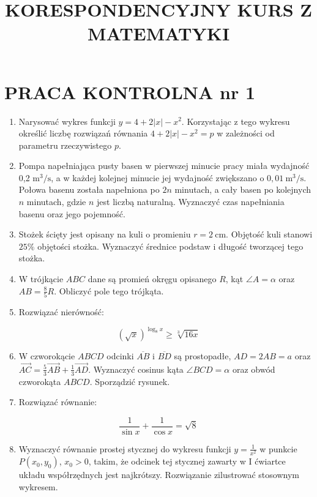 \documentclass[10pt]{article}
\title{KORESPONDENCYJNY KURS Z MATEMATYKI }
\author{}
\date{}
\begin{document}
\maketitle
\section*{PRACA KONTROLNA nr 1}
\begin{enumerate}
  \item Narysować wykres funkcji $y=4+2|x|-x^{2}$. Korzystając z tego wykresu określić liczbę rozwiązań równania $4+2|x|-x^{2}=p$ w zależności od parametru rzeczywistego $p$.
  \item Pompa napełniająca pusty basen w pierwszej minucie pracy miała wydajność 0,2 $\mathrm{m}^{3} / \mathrm{s}$, a w każdej kolejnej minucie jej wydajność zwiększano o $0,01 \mathrm{~m}^{3} / \mathrm{s}$. Połowa basenu została napełniona po $2 n$ minutach, a cały basen po kolejnych $n$ minutach, gdzie $n$ jest liczbą naturalną. Wyznaczyć czas napełniania basenu oraz jego pojemność.
  \item Stożek ścięty jest opisany na kuli o promieniu $r=2 \mathrm{~cm}$. Objętość kuli stanowi $25 \%$ objętości stożka. Wyznaczyć średnice podstaw i długość tworzącej tego stożka.
  \item W trójkącie $A B C$ dane są promień okręgu opisanego $R$, kąt $\angle A=\alpha$ oraz $A B=\frac{8}{5} R$. Obliczyć pole tego trójkąta.
  \item Rozwiązać nierówność:
\end{enumerate}

$$
(\sqrt{x})^{\log _{8} x} \geqslant \sqrt[3]{16 x}
$$

\begin{enumerate}
  \setcounter{enumi}{5}
  \item W czworokącie $A B C D$ odcinki $\overline{A B}$ i $\overline{B D}$ są prostopadłe, $A D=2 A B=a$ oraz $\overrightarrow{A C}=\frac{5}{3} \overrightarrow{A B}+\frac{1}{3} \overrightarrow{A D}$. Wyznaczyć cosinus kąta $\angle B C D=\alpha$ oraz obwód czworokąta $A B C D$. Sporządzić rysunek.
  \item Rozwiązać równanie:
\end{enumerate}

$$
\frac{1}{\sin x}+\frac{1}{\cos x}=\sqrt{8}
$$

\begin{enumerate}
  \setcounter{enumi}{7}
  \item Wyznaczyć równanie prostej stycznej do wykresu funkcji $y=\frac{1}{x^{2}}$ w punkcie $P\left(x_{0}, y_{0}\right)$, $x_{0}>0$, takim, że odcinek tej stycznej zawarty w I ćwiartce układu współrzędnych jest najkrótszy. Rozwiązanie zilustrować stosownym wykresem.
\end{enumerate}
\end{document}
